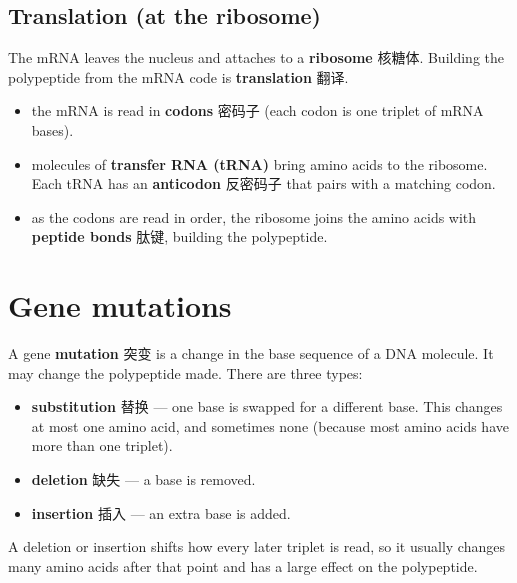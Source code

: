 \documentclass[11pt]{article}
\begin{document}
\subsection*{Translation (at the ribosome)}

The mRNA leaves the nucleus and attaches to a \textbf{ribosome} 核糖体. Building the polypeptide from the mRNA code is \textbf{translation} 翻译.

\begin{itemize}
\item the mRNA is read in \textbf{codons} 密码子 (each codon is one triplet of mRNA bases).

\item molecules of \textbf{transfer RNA (tRNA)} bring amino acids to the ribosome. Each tRNA has an \textbf{anticodon} 反密码子 that pairs with a matching codon.

\item as the codons are read in order, the ribosome joins the amino acids with \textbf{peptide bonds} 肽键, building the polypeptide.

\end{itemize}

\section*{Gene mutations}

A gene \textbf{mutation} 突变 is a change in the base sequence of a DNA molecule. It may change the polypeptide made. There are three types:

\begin{itemize}
\item \textbf{substitution} 替换 — one base is swapped for a different base. This changes at most one amino acid, and sometimes none (because most amino acids have more than one triplet).

\item \textbf{deletion} 缺失 — a base is removed.

\item \textbf{insertion} 插入 — an extra base is added.

\end{itemize}

A deletion or insertion shifts how every later triplet is read, so it usually changes many amino acids after that point and has a large effect on the polypeptide.
\end{document}

